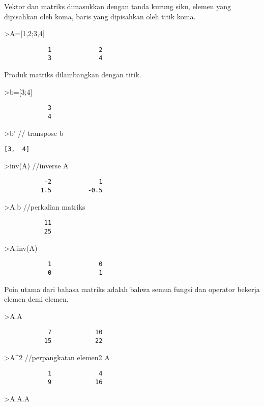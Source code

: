 \documentclass[
]{book}
\begin{document}
Vektor dan matriks dimasukkan dengan tanda kurung siku, elemen yang dipisahkan oleh koma, baris yang dipisahkan oleh titik koma.

\textgreater A={[}1,2;3,4{]}

\begin{verbatim}
            1             2 
            3             4 
\end{verbatim}

Produk matriks dilambangkan dengan titik.

\textgreater b={[}3;4{]}

\begin{verbatim}
            3 
            4 
\end{verbatim}

\textgreater b' // transpose b

\begin{verbatim}
[3,  4]
\end{verbatim}

\textgreater inv(A) //inverse A

\begin{verbatim}
           -2             1 
          1.5          -0.5 
\end{verbatim}

\textgreater A.b //perkalian matriks

\begin{verbatim}
           11 
           25 
\end{verbatim}

\textgreater A.inv(A)

\begin{verbatim}
            1             0 
            0             1 
\end{verbatim}

Poin utama dari bahasa matriks adalah bahwa semua fungsi dan operator bekerja elemen demi elemen.

\textgreater A.A

\begin{verbatim}
            7            10 
           15            22 
\end{verbatim}

\textgreater A\^{}2 //perpangkatan elemen2 A

\begin{verbatim}
            1             4 
            9            16 
\end{verbatim}

\textgreater A.A.A
\end{document}
